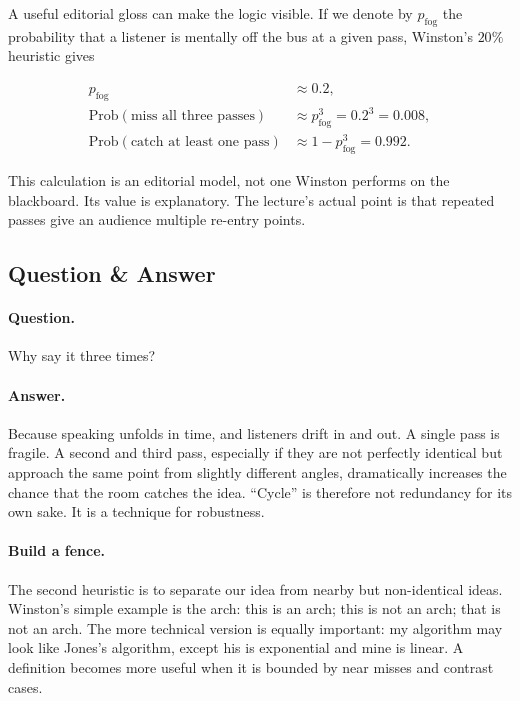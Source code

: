 A useful editorial gloss can make the logic visible. If we denote by \(p_{\mathrm{fog}}\) the probability that a listener is mentally off the bus at a given pass, Winston's \(20\%\) heuristic gives

\begin{align}
p_{\mathrm{fog}} &\approx 0.2,\\
\mathrm{Prob}(\text{miss all three passes}) &\approx p_{\mathrm{fog}}^3 = 0.2^3 = 0.008,\\
\mathrm{Prob}(\text{catch at least one pass}) &\approx 1-p_{\mathrm{fog}}^3 = 0.992.
\end{align}

\begin{remark}
This calculation is an editorial model, not one Winston performs on the blackboard. Its value is explanatory. The lecture's actual point is that repeated passes give an audience multiple re-entry points.
\end{remark}

\subsection{Question \& Answer}

\paragraph{Question.} Why say it three times?

\paragraph{Answer.} Because speaking unfolds in time, and listeners drift in and out. A single pass is fragile. A second and third pass, especially if they are not perfectly identical but approach the same point from slightly different angles, dramatically increases the chance that the room catches the idea. ``Cycle'' is therefore not redundancy for its own sake. It is a technique for robustness.

\paragraph{Build a fence.} The second heuristic is to separate our idea from nearby but non-identical ideas. Winston's simple example is the arch: this is an arch; this is not an arch; that is not an arch. The more technical version is equally important: my algorithm may look like Jones's algorithm, except his is exponential and mine is linear. A definition becomes more useful when it is bounded by near misses and contrast cases.

